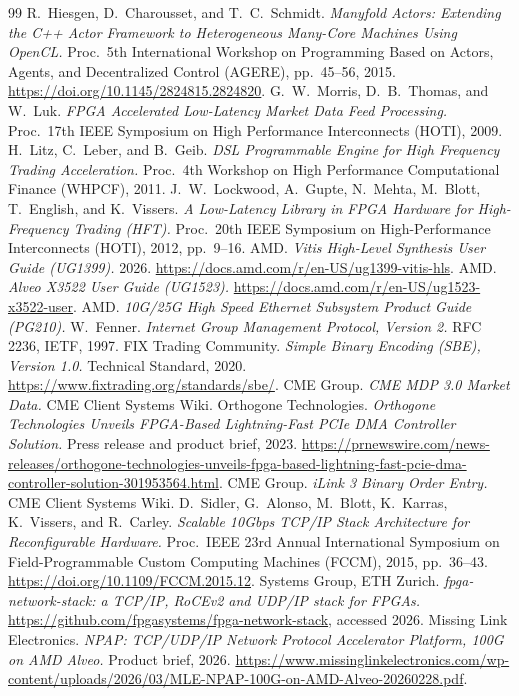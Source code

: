 \documentclass[11pt]{article}
\begin{document}
\begin{thebibliography}{99}
 R.~Hiesgen, D.~Charousset, and T.~C.~Schmidt.
  \emph{Manyfold Actors: Extending the C++ Actor Framework to Heterogeneous
  Many-Core Machines Using OpenCL.} Proc.\ 5th International Workshop on
  Programming Based on Actors, Agents, and Decentralized Control (AGERE),
  pp.~45--56, 2015. \url{https://doi.org/10.1145/2824815.2824820}.
 G.~W.~Morris, D.~B.~Thomas, and W.~Luk.
  \emph{FPGA Accelerated Low-Latency Market Data Feed Processing.}
  Proc.\ 17th IEEE Symposium on High Performance Interconnects (HOTI), 2009.
 H.~Litz, C.~Leber, and B.~Geib.
  \emph{DSL Programmable Engine for High Frequency Trading Acceleration.}
  Proc.\ 4th Workshop on High Performance Computational Finance (WHPCF), 2011.
 J.~W.~Lockwood, A.~Gupte, N.~Mehta, M.~Blott,
  T.~English, and K.~Vissers.
  \emph{A Low-Latency Library in FPGA Hardware for High-Frequency Trading
  (HFT).} Proc.\ 20th IEEE Symposium on High-Performance Interconnects (HOTI),
  2012, pp.~9--16.
 AMD.
  \emph{Vitis High-Level Synthesis User Guide (UG1399).} 2026.
  \url{https://docs.amd.com/r/en-US/ug1399-vitis-hls}.
 AMD.
  \emph{Alveo X3522 User Guide (UG1523).}
  \url{https://docs.amd.com/r/en-US/ug1523-x3522-user}.
 AMD.
  \emph{10G/25G High Speed Ethernet Subsystem Product Guide (PG210).}
 W.~Fenner.
  \emph{Internet Group Management Protocol, Version 2.} RFC 2236, IETF, 1997.
 FIX Trading Community.
  \emph{Simple Binary Encoding (SBE), Version 1.0.} Technical Standard, 2020.
  \url{https://www.fixtrading.org/standards/sbe/}.
 CME Group.
  \emph{CME MDP 3.0 Market Data.} CME Client Systems Wiki.
 Orthogone Technologies.
  \emph{Orthogone Technologies Unveils FPGA-Based Lightning-Fast PCIe DMA
  Controller Solution.} Press release and product brief, 2023.
  \url{https://prnewswire.com/news-releases/orthogone-technologies-unveils-fpga-based-lightning-fast-pcie-dma-controller-solution-301953564.html}.
 CME Group.
  \emph{iLink 3 Binary Order Entry.} CME Client Systems Wiki.
 D.~Sidler, G.~Alonso, M.~Blott, K.~Karras, K.~Vissers,
  and R.~Carley. \emph{Scalable 10Gbps TCP/IP Stack Architecture for
  Reconfigurable Hardware.} Proc.\ IEEE 23rd Annual International Symposium on
  Field-Programmable Custom Computing Machines (FCCM), 2015, pp.~36--43.
  \url{https://doi.org/10.1109/FCCM.2015.12}.
 Systems Group, ETH Zurich.
  \emph{fpga-network-stack: a TCP/IP, RoCEv2 and UDP/IP stack for FPGAs.}
  \url{https://github.com/fpgasystems/fpga-network-stack}, accessed 2026.
 Missing Link Electronics.
  \emph{NPAP: TCP/UDP/IP Network Protocol Accelerator Platform, 100G on AMD
  Alveo.} Product brief, 2026.
  \url{https://www.missinglinkelectronics.com/wp-content/uploads/2026/03/MLE-NPAP-100G-on-AMD-Alveo-20260228.pdf}.
\end{thebibliography}
\end{document}
